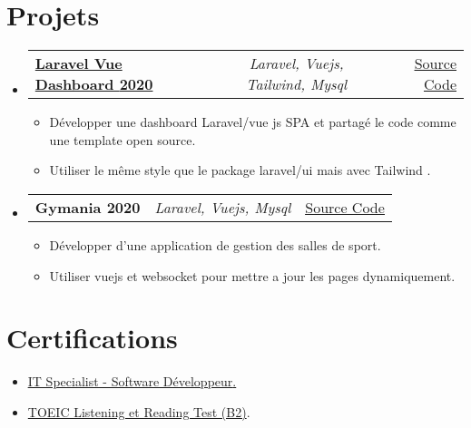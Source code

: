 \documentclass[a4paper,11pt]{article}
\makeatletter
\newcommand{\resumeItem}[1]{
  \item\small{#1}
}
\newcommand{\resumeItemListStart}{\begin{itemize}[rightmargin=0.11in]}
\newcommand{\resumeItemListEnd}{\end{itemize}}
\newcommand{\resumeTrioHeading}[3]{
  \item\small{
    \begin{tabular*}{0.96\textwidth}[t]{
      l@{\extracolsep{\fill}}c@{\extracolsep{\fill}}r
    }
      \textbf{#1} & \textit{#2} & #3
    \end{tabular*}
  }
}
\newcommand{\resumeHeadingListStart}{
  \begin{itemize}[leftmargin=0.15in, label={}]
}
\newcommand{\resumeHeadingListEnd}{\end{itemize}}
\makeatother
\begin{document}
\section{Projets}
  \resumeHeadingListStart{}
    \resumeTrioHeading{\href{https://project1.com}{Laravel Vue Dashboard \textsc{2020}}}{Laravel, Vuejs, Tailwind, Mysql}{\href{https://github.com/HijenHEK/laravel-vue-sanctum-spa}{\uline{Source Code}}}
      \resumeItemListStart{}
        \resumeItem{Développer une dashboard Laravel/vue js SPA et partagé le code comme une template open source.}
        \resumeItem{Utiliser le même style que le package laravel/ui mais avec Tailwind .}
      \resumeItemListEnd{}

      \resumeTrioHeading{Gymania \textsc{2020}}{Laravel, Vuejs, Mysql}{\href{https://github.com/HijenHEK/gymania}{\uline{Source Code}}}
      \resumeItemListStart{}
        \resumeItem{Développer d'une application de gestion des salles de sport.}
        \resumeItem{Utiliser vuejs et websocket pour mettre a jour les pages dynamiquement.}
      \resumeItemListEnd{}
  \resumeHeadingListEnd{}



\section{Certifications}
  \resumeItemListStart{}
    \resumeItem{\href{https://www.credly.com/badges/89c72af7-5085-4fd9-8828-b404e7b414c8/linked_in_profile}{\uline{IT Specialist - Software Développeur}.}}\\
    \resumeItem{\uline{TOEIC Listening et Reading Test (B2)}.}
  \resumeItemListEnd{}
\end{document}
